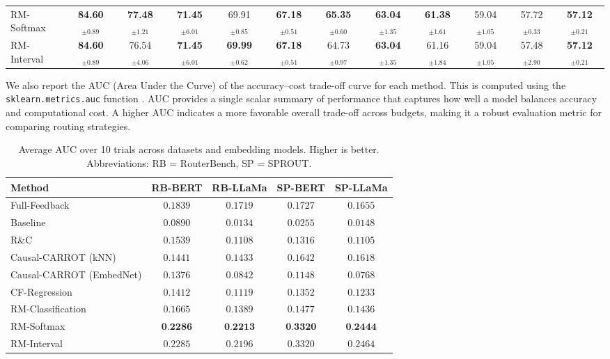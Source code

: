 \documentclass{article}
\theoremstyle{remark}
\begin{document}
\begin{table}[H]
{\begin{tabular}{lccccccccccc}
RM-Softmax & \textbf{84.60}$_{\pm0.89}$ & \textbf{77.48}$_{\pm1.21}$ & \textbf{71.45}$_{\pm6.01}$ & 69.91$_{\pm0.85}$ & \textbf{67.18}$_{\pm0.51}$ & \textbf{65.35}$_{\pm0.60}$ & \textbf{63.04}$_{\pm1.35}$ & \textbf{61.38}$_{\pm1.61}$ & 59.04$_{\pm1.05}$ & 57.72$_{\pm0.33}$ & \textbf{57.12}$_{\pm0.21}$ \\ \hdashline
RM-Interval & \textbf{84.60}$_{\pm0.89}$ & 76.54$_{\pm4.06}$ & \textbf{71.45}$_{\pm6.01}$ & \textbf{69.99}$_{\pm0.62}$ & \textbf{67.18}$_{\pm0.51}$ & 64.73$_{\pm0.97}$ & \textbf{63.04}$_{\pm1.35}$ & 61.16$_{\pm1.84}$ & 59.04$_{\pm1.05}$ & 57.48$_{\pm2.90}$ & \textbf{57.12}$_{\pm0.21}$ \\
\bottomrule
\end{tabular}
}
\end{table}

We also report the AUC (Area Under the Curve) of the accuracy–cost trade-off curve for each method. This is computed using the \texttt{sklearn.metrics.auc}  function \cite{sklearn_api}. AUC provides a single scalar summary of performance that captures how well a model balances accuracy and computational cost. A higher AUC indicates a more favorable overall trade-off across budgets, making it a robust evaluation metric for comparing routing strategies.


\begin{table}[H]
\centering
\caption{Average AUC over 10 trials across datasets and embedding models. Higher is better. Abbreviations: RB = RouterBench, SP = SPROUT.}
\label{tab:single_lambda_auc}
\begin{tabular}{lcccc}
\toprule
\textbf{Method} & \textbf{RB-BERT} & \textbf{RB-LLaMa} & \textbf{SP-BERT} & \textbf{SP-LLaMa} \\
\midrule

Full-Feedback      & $0.1839$ & $0.1719$& $0.1727$  & $0.1655$  \\ \hdashline
Baseline    & $0.0890$ &  $0.0134$& $0.0255$ & $0.0148$ \\
R\&C      & $0.1539$ & $0.1108$ & $0.1316$ & $0.1105$ \\
Causal-CARROT (kNN)      & $0.1441$ & $0.1433$&$0.1642$  &  $0.1618$ \\
Causal-CARROT (EmbedNet)      & $0.1376$ & $0.0842$ & $0.1148$  & $0.0768$ \\


CF-Regression         & $0.1412$ & $0.1119$&  $0.1352$& $0.1233$ \\
RM-Classification     & $0.1665$ & $0.1389$ & $0.1477$ & $0.1436$ \\
RM-Softmax  & $\textbf{0.2286}$ & $\textbf{0.2213}$ &  $\textbf{0.3320}$ & $\textbf{0.2444}$  \\
\hdashline
RM-Interval  & $0.2285$ & $0.2196$ &  $0.3320$ & $0.2464$  \\
\bottomrule
\end{tabular}
\end{table}
\end{document}
